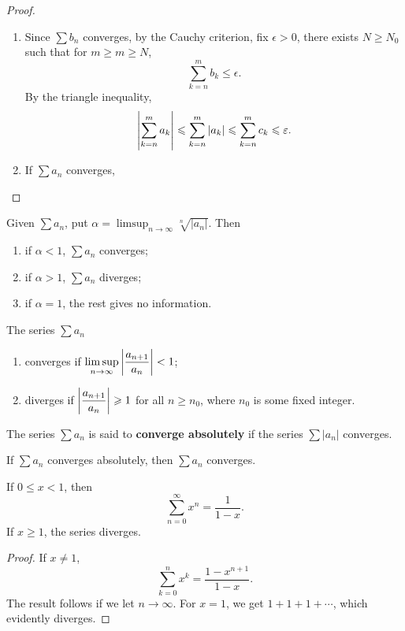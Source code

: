 \begin{proof} \
\begin{enumerate}[label=(\arabic*)]
\item Since $\sum b_n$ converges, by the Cauchy criterion, fix $\epsilon>0$, there exists $N\ge N_0$ such that for $m\ge m\ge N$,
\[\sum_{k=n}^{m}b_k\le\epsilon.\]
By the triangle inequality,
\[\left|\sum_{k=n}^{m}a_k\right|\leqslant\sum_{k=n}^{m}|a_k|\leqslant\sum_{k=n}^{m}c_k\leqslant\varepsilon.\]
\item If $\sum a_n$ converges, 
\end{enumerate}
\end{proof}

\begin{lemma}
Given $\sum a_n$, put $\displaystyle\alpha=\limsup_{n\to\infty}\sqrt[n]{|a_n|}$. Then
\begin{enumerate}[label=(\roman*)]
\item if $\alpha<1$, $\sum a_n$ converges;
\item if $\alpha>1$, $\sum a_n$ diverges;
\item if $\alpha=1$, the rest gives no information.
\end{enumerate}
\end{lemma}

\begin{lemma}
The series $\sum a_n$
\begin{enumerate}[label=(\roman*)]
\item converges if $\displaystyle\limsup_{n\to\infty}\left|\frac{a_{n+1}}{a_n}\right|<1$;
\item diverges if $\displaystyle\left|\frac{a_{n+1}}{a_n}\right|\geqslant1$ for all $n\ge n_0$, where $n_0$ is some fixed integer.
\end{enumerate}
\end{lemma}

The series $\sum a_n$ is said to \textbf{converge absolutely} if the series $\sum|a_n|$ converges.

\begin{lemma}
If $\sum a_n$ converges absolutely, then $\sum a_n$ converges.
\end{lemma}

\begin{proposition}
If $0\le x<1$, then
\[\sum_{n=0}^{\infty}x^n=\frac{1}{1-x}.\]
If $x\ge1$, the series diverges.
\end{proposition}

\begin{proof}
If $x\neq1$,
\[\sum_{k=0}^{n}x^k=\frac{1-x^{n+1}}{1-x}.\]
The result follows if we let $n\to\infty$. For $x=1$, we get $1+1+1+\cdots$, which evidently diverges.
\end{proof}

